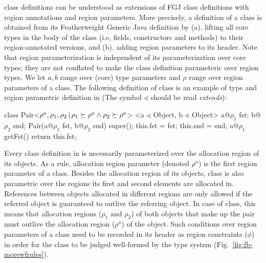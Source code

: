 \FB class definitions can be understood as extensions of FGJ class
definitions with region annotations and region parameters. More
precisely, a \fbname definition of a class is obtained from its
Featherweight Generic Java definition by (a). lifting all core types
in the body of the class (i.e, fields, constructors and methods) to
their region-annotated versions, and (b). adding region parameters to
its header. Note that region parameterization is independent of its
parameterization over core types; they are not conflated to make the
class definition parameteric over region types. We let $a, b$ range
over (core) type parameters and $\rho$ range over region parameters of
a class. The following definition of  class is an example of
type and region parametric definition in \FB (The symbol $\triangleleft$
should be read \emph{extends}):
\begin{codejava}[mathescape=true]
class Pair<$\rho^a, \rho_1, \rho_2 \,|\, \rho_1 \succeq \rho^a 
                      \wedge \rho_2 \succeq \rho^a$>
          <a $\triangleleft$ Object, b $\triangleleft$ Object> {
  a@$\rho_1$ fst; 
  b@$\rho_2$ snd;
  Pair(a@$\rho_1$ fst, b@$\rho_2$ snd) {
    super(); 
    this.fst = fst; 
    this.snd = snd;
  }
  a@$\rho_1$ getFst() {
    return this.fst;
  }
}
\end{codejava}
Every class definition in \FB is necessarily parameterized over the
allocation region of its objects. As a rule, allocation region
parameter (denoted $\rho^a$) is the first region parameter of a class.
Besides the allocation region of its objects,  class is also
parametric over the regions its first and second elements are
allocated in. References between objects allocated in different
regions are only allowed if the referred object is guaranteed to
outlive the referring object. In case of  class, this means
that allocation regions ($\rho_1$ and $\rho_2$) of both objects that
make up the pair must outlive the allocation region ($\rho^a$) of the
 object. Such conditions over region parameters of a class
need to be recorded in its header as region constraints ($\phi$) in
order for the class to be judged well-formed by the type system
(Fig.~\ref{fig:fb-morewfrules}). 

